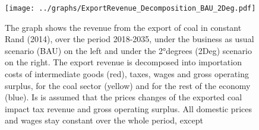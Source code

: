 \documentclass[12pt,english]{article}
\begin{document}
\begin{figure}[!h]
	\hspace{-10pt}\texttt{[image: ../graphs/ExportRevenue\_Decomposition\_BAU\_2Deg.pdf]}
	\caption{\label{ExportRevenue_Decomposition_Diff}\small The graph shows the revenue from the export of coal in constant Rand (2014), over the period 2018-2035, under the business as usual scenario (BAU) on the left and under the 2°degrees (2Deg) scenario on the right. The export revenue is decomposed into importation costs of intermediate goods (red), taxes, wages and gross operating surplus, for the coal sector (yellow) and for the rest of the economy (blue). Is is assumed that the prices changes of the exported coal impact tax revenue and gross operating surplus. All domestic prices and wages stay constant over the whole period, except  }
\end{figure}
\end{document}
